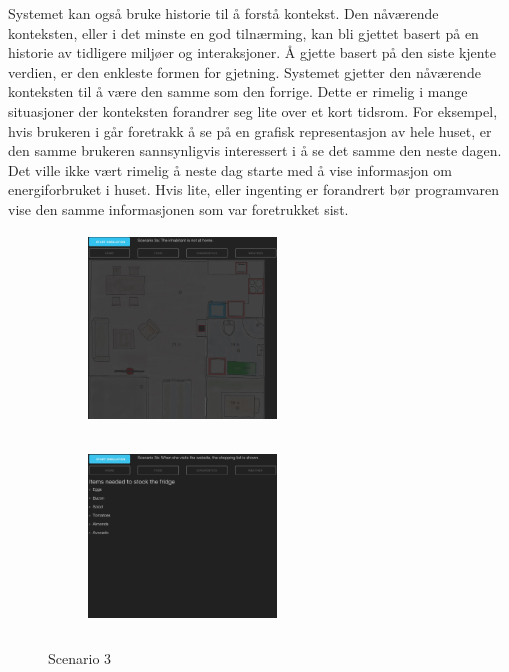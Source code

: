 Systemet kan også bruke historie til å forstå kontekst. Den nåværende konteksten, eller i det minste en god tilnærming, kan bli gjettet basert på en historie av tidligere miljøer og interaksjoner. Å gjette basert på den siste kjente verdien, er den enkleste formen for gjetning. Systemet gjetter den nåværende konteksten til å være den samme som den forrige. Dette er rimelig i mange situasjoner der konteksten forandrer seg lite over et kort tidsrom. For eksempel, hvis brukeren i går foretrakk å se på en grafisk representasjon av hele huset, er den samme brukeren sannsynligvis interessert i å se det samme den neste dagen. Det ville ikke vært rimelig å neste dag starte med å vise informasjon om energiforbruket i huset. Hvis lite, eller ingenting er forandrert bør programvaren vise den samme informasjonen som var foretrukket sist.
\begin{figure}[ht]
\centering
\begin{subfigure}{0.32\textwidth}
\includegraphics[width=5cm, height=5cm]{fig/scenario3a}
\caption{}
\label{fig:3a}
\end{subfigure}
\begin{subfigure}{0.32\textwidth}
\includegraphics[width=5cm, height=5cm]{fig/scenario3b}
\caption{}
\label{fig:3b}
\end{subfigure}
\caption{Scenario 3}
\label{fig:scenario3}
\end{figure}
